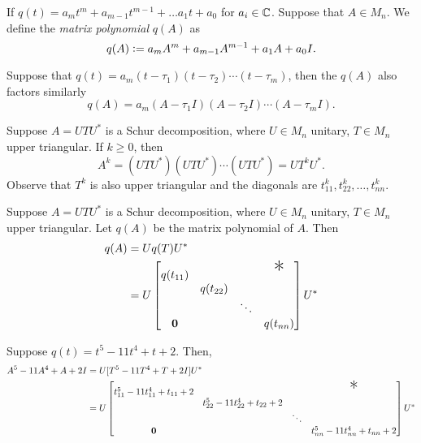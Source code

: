\begin{definition}
If $q(t) = a_mt^m + a_{m-1}t^{m-1} + \dots a_1 t + a_0$ for $a_i \in \mathbb C$. Suppose that $A \in M_n$. We define the \textit{matrix polynomial} $q(A)$ as
$$
q(A) \vcentcolon= a_mA^m + a_{m-1}A^{m-1} + a_1 A + a_0 I.
$$
\end{definition}

\begin{remark*}
Suppose that $q(t) = a_m (t - \tau_1)(t - \tau_2) \cdots (t - \tau_m)$, then the $q(A)$ also factors similarly
$$
q(A) = a_m (A - \tau_1 I)(A - \tau_2 I) \cdots (A - \tau_m I).
$$
\end{remark*}

\begin{note*}
Suppose $A = UTU^*$ is a Schur decomposition, where $U \in M_n$ unitary, $T \in M_n$ upper triangular. If $k \geq 0$, then 
$$
A^k = (UTU^*)(UTU^*) \cdots (UTU^*) = UT^kU^*.
$$
Observe that $T^k$ is also upper triangular and the diagonals are $t_{11}^k, t_{22}^k, \dots, t_{nn}^k$. \\
\end{note*}

\begin{remark*}
Suppose $A = UTU^*$ is a Schur decomposition, where $U \in M_n$ unitary, $T \in M_n$ upper triangular. Let $q(A)$ be the matrix polynomial of $A$. Then
\begin{align*}
    q(A) &= Uq(T)U^* \\
         &= U 
         \begin{bmatrix}
            q(t_{11}) & & & \textup{\huge*} \\
            & q(t_{22}) & & \\
            & & \ddots & \\
            \mathbf{0} & & & q(t_{nn}) \\
         \end{bmatrix}
         U^* \\
\end{align*}
\end{remark*}

\begin{example}
Suppose $q(t) = t^5 - 11t^4 + t + 2$. Then,
\begin{align*}
A^5 - 11A^4 + A + 2I 
    &= U[T^5 - 11T^4 + T + 2I]U^* \\
    &= U \begin{bmatrix}
    t_{11}^5 - 11t_{11}^4 + t_{11} + 2 & & & \textup{\huge*} \\
    & t_{22}^5 - 11t_{22}^4 + t_{22} + 2 & & \\
    & & \ddots & \\
    \mathbf{0} & & & t_{nn}^5 - 11t_{nn}^4 + t_{nn} + 2 \\
    \end{bmatrix}U^*
\end{align*}
\end{example}

